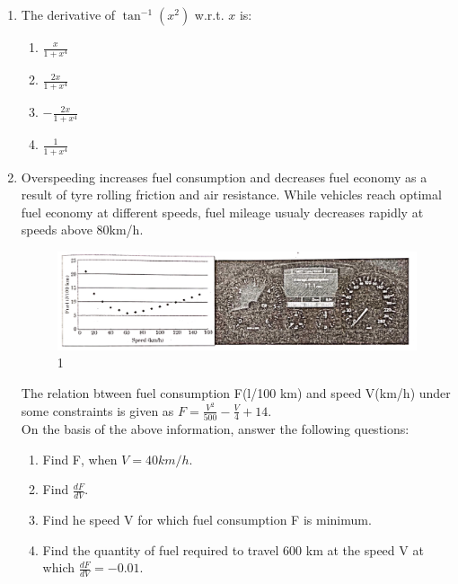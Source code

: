 \documentclass{article}
\begin{document}
\begin{enumerate}
	\item The derivative of $\tan^{-1}(x^{2})$ w.r.t. $x$ is:
		\begin{enumerate}
			\item $\frac{x}{1 + x^{4}}$
			\item $\frac{2x}{1 +x^{4}}$
			\item $-\frac{2x}{1 + x^{4}}$
			\item $\frac{1}{1+x^{4}}$
		\end{enumerate}
	\item Overspeeding increases fuel consumption and decreases fuel economy as a result of tyre rolling friction and air resistance. While vehicles reach optimal fuel economy at different speeds, fuel mileage usualy decreases rapidly at speeds above 80km/h. \\
		\begin{figure}[h]
			\centering
			      \includegraphics[width=120mm]{./Figuress/Speed.jpg}
			      \caption{1}
			\label{Figure}
		\end{figure}
		The relation btween fuel consumption F(l/100 km) and speed V(km/h) under some constraints is given as $F = \frac{V^{2}}{500} - \frac{V}{4} +14$. \\
		On the basis of the above information, answer the following questions:
		\begin{enumerate}[label=(\roman*)]
			\item  Find F, when $V = 40km/h$.
			\item  Find $\frac{dF}{dV}$.
			\item  Find he speed V for which fuel consumption F is minimum.
			\item  Find the quantity of fuel required to travel 600 km at the speed V at which $\frac{dF}{dV} = -0.01$.
		\end{enumerate}
\end{enumerate}
\end{document}
